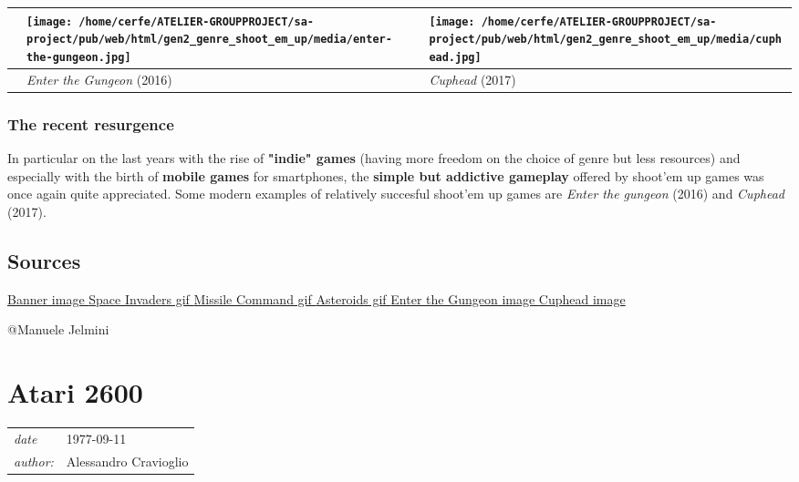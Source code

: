 \documentclass[a4paper,10pt]{book}
\newcommand{\pageHeader}[4]{
    \section{#1}
    \vspace{-0.3cm}
    \begin{table}[h!]
     \begin{tabular}{ll}
        \hline
        \textit{date} & #2 \\
        \textit{author: } & #3\\
        \hline
     \end{tabular}
    \end{table}
    \vspace{-0.3cm}
}
\begin{document}
 
 \begin{longtable}{p{1mm}|l|l|}\hline
 
 & \texttt{[image: /home/cerfe/ATELIER-GROUPPROJECT/sa-project/pub/web/html/gen2\_genre\_shoot\_em\_up/media/enter-the-gungeon.jpg]}
 & \texttt{[image: /home/cerfe/ATELIER-GROUPPROJECT/sa-project/pub/web/html/gen2\_genre\_shoot\_em\_up/media/cuphead.jpg]}
 \\\hline
 
 & \textit{Enter the Gungeon } (2016) 
 & \textit{Cuphead } (2017) 
 \\\hline
 \end{longtable}
 
 \subsubsection{The recent resurgence }
 
 
          In particular on the last years with the rise of  \textbf{"indie" games }  (having more freedom on the choice of genre but less resources) and especially with the birth of  \textbf{mobile games }  for smartphones,
          the  \textbf{simple but addictive gameplay }  offered by shoot'em up games was once again quite appreciated.
          Some modern examples of relatively succesful shoot'em up games are  \textit{Enter the gungeon }(2016) and  \textit{Cuphead }(2017).
         
 
 \subsection{Sources }
 \href{https://www.seekpng.com/png/full/77-774983_shoot-em-ups-logo-shoot-em-ups-logo.png}{Banner image }
 \href{https://miro.medium.com/max/1000/1*qFHnCDhep6OmqkbVN6NY_g.gif}{Space Invaders gif }  
 \href{https://i0.wp.com/www.techsavvyed.net/wp-content/uploads/2012/12/missile-command.gif?resize=598%2C444}{Missile Command gif }  
 \href{https://707232.smushcdn.com/1540253/wp-content/uploads/2020/01/asteroids-atari-2600.gif?lossy=1&strip=1&webp=1}{Asteroids gif }  
 \href{https://www.nintendoworldreport.com/media/44216/1/2.jpg}{Enter the Gungeon image }  
 \href{https://static.wikia.nocookie.net/cuphead/images/0/04/Pic01.jpg/revision/latest/scale-to-width-down/940?cb=20180514011844}{Cuphead image }  
 
 @Manuele Jelmini 
 
 \newpage\pageHeader{Atari 2600}{1977-09-11}{Alessandro Cravioglio}{The Atari 2600 is one of the most influential console of the world}
\end{document}
